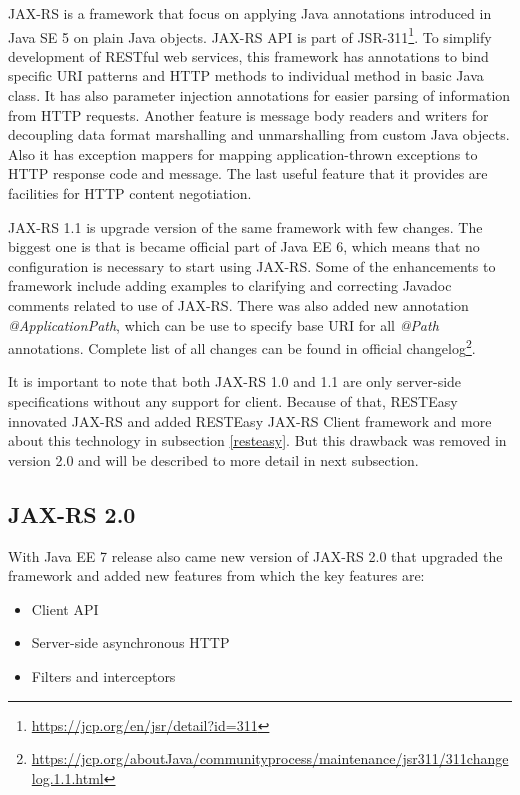 \documentclass[12pt,final,oneside]{fithesis2}
\begin{document}
JAX-RS is a framework that focus on applying Java annotations introduced in Java SE 5 on plain Java objects. JAX-RS API is part of JSR-311\footnote{\url{https://jcp.org/en/jsr/detail?id=311}}. To simplify development of RESTful web services, this framework has annotations to bind specific URI patterns and HTTP methods to individual method in basic Java class. It has also parameter injection annotations for easier parsing of information from HTTP requests. Another feature is message body readers and writers for decoupling data format marshalling and unmarshalling from custom Java objects. Also it has exception mappers for mapping application-thrown exceptions to HTTP response code and message. The last useful feature that it provides are facilities for HTTP content negotiation.\cite{resteasy-book}\cite{jax-wiki}

JAX-RS 1.1 is upgrade version of the same framework with few changes. The biggest one is that is became official part of Java EE 6, which means that no configuration is necessary to start using JAX-RS. Some of  the enhancements to framework include adding examples to clarifying and correcting Javadoc comments related to use of JAX-RS. There was also added new annotation \textit{@ApplicationPath}, which can be use to specify base URI for all \textit{@Path} annotations. Complete list of all changes can be found in official changelog\footnote{\url{https://jcp.org/aboutJava/communityprocess/maintenance/jsr311/311changelog.1.1.html}}. \cite{jax-1.1}\cite{jax-1.1-2}

It is important to note that both JAX-RS 1.0 and 1.1 are only server-side specifications without any support for client. Because of that, RESTEasy innovated JAX-RS and added RESTEasy JAX-RS Client framework and more about this technology in subsection \ref{resteasy}. But this drawback was removed in version 2.0 and will be described to more detail in next subsection.

\subsection{JAX-RS 2.0}\label{jax2.0}
With Java EE 7 release also came new version of JAX-RS 2.0 that upgraded the framework and added new features from which the key features are:
\begin{itemize}
\item
Client API

\item 
Server-side asynchronous HTTP

\item
Filters and interceptors
\end{itemize}
\end{document}
